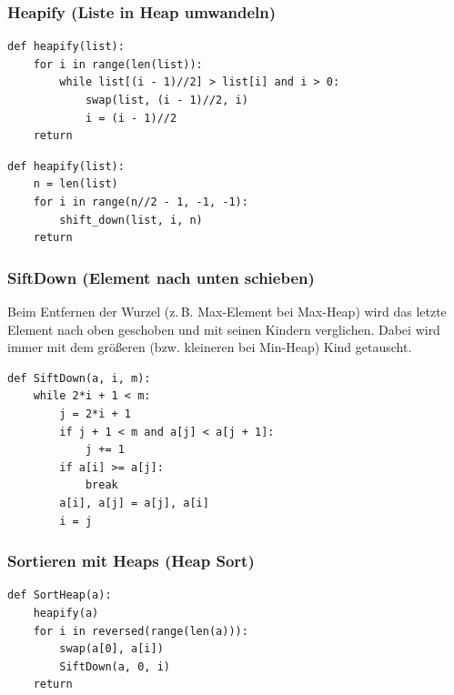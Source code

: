 \subsubsection{Heapify (Liste in Heap umwandeln)}
\begin{codebox}
\begin{lstlisting}[style=CodeExpert]
def heapify(list):
    for i in range(len(list)):
        while list[(i - 1)//2] > list[i] and i > 0:
            swap(list, (i - 1)//2, i)
            i = (i - 1)//2
    return
\end{lstlisting}
\end{codebox}
\begin{codebox}[Variante 2]
\begin{lstlisting}[style=CodeExpert]
def heapify(list):
    n = len(list)
    for i in range(n//2 - 1, -1, -1):
        shift_down(list, i, n)
    return
\end{lstlisting}
\end{codebox}

\subsubsection{SiftDown (Element nach unten schieben)}
\begin{contentbox}
Beim Entfernen der Wurzel (z.\,B. Max-Element bei Max-Heap) wird das letzte Element nach oben geschoben und mit seinen Kindern verglichen. Dabei wird immer mit dem größeren (bzw. kleineren bei Min-Heap) Kind getauscht.
\end{contentbox}
\begin{codebox}
\begin{lstlisting}[style=CodeExpert]
def SiftDown(a, i, m):
    while 2*i + 1 < m:
        j = 2*i + 1
        if j + 1 < m and a[j] < a[j + 1]:
            j += 1
        if a[i] >= a[j]:
            break
        a[i], a[j] = a[j], a[i]
        i = j
\end{lstlisting}
\end{codebox}

\subsubsection{Sortieren mit Heaps (Heap Sort)}
\begin{codebox}
\begin{lstlisting}[style=CodeExpert]
def SortHeap(a):
    heapify(a)
    for i in reversed(range(len(a))):
        swap(a[0], a[i])
        SiftDown(a, 0, i)
    return
\end{lstlisting}
\end{codebox}

